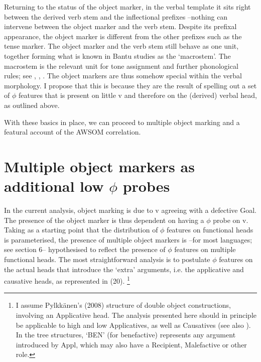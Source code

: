 \documentclass[output=paper
,modfonts
,nonflat]{langsci/langscibook}
\begin{document}
Returning to the status of the object marker, in the verbal template it sits right between the derived verb stem and the inflectional prefixes –nothing can intervene between the object marker and the verb stem. Despite its prefixal appearance, the object marker is different from the other prefixes such as the tense marker. The object marker and the verb stem still behave as one unit, together forming what is known in Bantu studies as the ‘macrostem’. The macrostem is the relevant unit for tone assignment and further phonological rules; see \citet{Hyman2003}, \citet{Hyman_et_al2008}, \citet{Marlo2015}. The object markers are thus somehow special within the verbal morphology. I propose that this is because they are the result of spelling out a set of $\phi$ features that is present on little v and therefore on the (derived) verbal head, as outlined above.

With these basics in place, we can proceed to multiple object marking and a featural account of the AWSOM correlation.

\section{ Multiple object markers as additional low $\phi$ probes}
In the current analysis, object marking is due to v agreeing with a defective Goal. The presence of the object marker is thus dependent on having a $\phi$ probe on v. Taking as a starting point that the distribution of $\phi$ features on functional heads is parameterised, the presence of multiple object markers is –for most languages; see section 6– hypothesised to reflect the presence of $\phi$ features on multiple functional heads. The most straightforward analysis is to postulate $\phi$ features on the actual heads that introduce the ‘extra’ arguments, i.e. the applicative and causative heads, as represented in (20).{} \footnote{I assume Pylkkänen’s (2008) structure of double object constructions, involving an Applicative head. The analysis presented here should in principle be applicable to high and low Applicatives, as well as Causatives (see also \citealt{Van_der_Wal2017}). In the tree structures, ‘BEN’ (for benefactive) represents any argument introduced by Appl, which may also have a Recipient, Malefactive or other role.}
\end{document}

